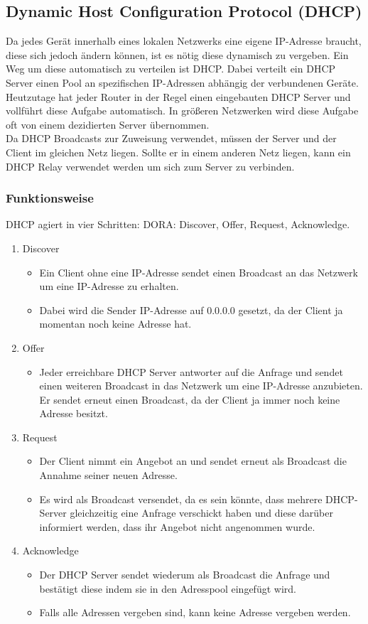\documentclass{article}
\begin{document}
	 \subsection{Dynamic Host Configuration Protocol (DHCP)}
	 Da jedes Gerät innerhalb eines lokalen Netzwerks eine eigene IP-Adresse braucht, diese sich jedoch ändern können, ist es nötig diese dynamisch zu vergeben. Ein Weg um diese automatisch zu verteilen ist DHCP. Dabei verteilt ein DHCP Server einen Pool an spezifischen IP-Adressen abhängig der verbundenen Geräte. Heutzutage hat jeder Router in der Regel einen eingebauten DHCP Server und vollführt diese Aufgabe automatisch. In größeren Netzwerken wird diese Aufgabe oft von einem dezidierten Server übernommen. \\
	 Da DHCP Broadcasts zur Zuweisung verwendet, müssen der Server und der Client im gleichen Netz liegen. Sollte er in einem anderen Netz liegen, kann ein DHCP Relay verwendet werden um sich zum Server zu verbinden. \\
	 \subsubsection{Funktionsweise}
	 DHCP agiert in vier Schritten: DORA: Discover, Offer, Request, Acknowledge.
	 \begin{enumerate}
	 	\item{Discover}
	 	\begin{itemize}
	 		\item{Ein Client ohne eine IP-Adresse sendet einen Broadcast an das Netzwerk um eine IP-Adresse zu erhalten.}
	 		\item{Dabei wird die Sender IP-Adresse auf 0.0.0.0 gesetzt, da der Client ja momentan noch keine Adresse hat.}
	 	\end{itemize}
	 	\item{Offer}
	 	\begin{itemize}
	 		\item{Jeder erreichbare DHCP Server antworter auf die Anfrage und sendet einen weiteren Broadcast in das Netzwerk um eine IP-Adresse anzubieten. Er sendet erneut einen Broadcast, da der Client ja immer noch keine Adresse besitzt.}
	 	\end{itemize}
	 	\item{Request}
	 	\begin{itemize}
	 		\item{Der Client nimmt ein Angebot an und sendet erneut als Broadcast die Annahme seiner neuen Adresse.}
	 		\item{Es wird als Broadcast versendet, da es sein könnte, dass mehrere DHCP-Server gleichzeitig eine Anfrage verschickt haben und diese darüber informiert werden, dass ihr Angebot nicht angenommen wurde.}
	 	\end{itemize}
	 	\item{Acknowledge}
	 	\begin{itemize}
	 		\item{Der DHCP Server sendet wiederum als Broadcast die Anfrage und bestätigt diese indem sie in den Adresspool eingefügt wird.}
	 		\item{Falls alle Adressen vergeben sind, kann keine Adresse vergeben werden.}
	 	\end{itemize}
	 \end{enumerate}
\end{document}
